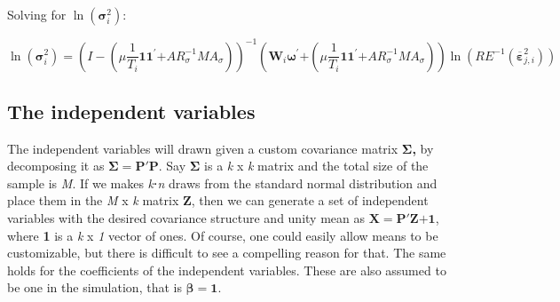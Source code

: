 \documentclass{article}
\begin{document}
Solving for $\ln\left( \mathbf{\sigma}_{i}^{2} \right)$:

\[\ln\left( \mathbf{\sigma}_{i}^{2} \right) = \left( I - \left( \mu\frac{1}{T_{i}}\mathbf{1}\mathbf{1}^{\mathbf{'}}\mathbf{+}{AR}_{\sigma}^{- 1}MA_{\sigma} \right) \right)^{- 1}\left( \mathbf{W}_{i}\mathbf{\omega}^{\mathbf{'}}\mathbf{+}\left( \mu\frac{1}{T_{i}}\mathbf{1}\mathbf{1}^{\mathbf{'}}\mathbf{+}{AR}_{\sigma}^{- 1}MA_{\sigma} \right) \right)\ln\left( {RE}^{- 1}\left( {\overline{\mathbf{\varepsilon}}}_{j,i}^{2} \right) \right)\]

\subsection{The independent variables}\label{the-independent-variables}

The independent variables will drawn given a custom covariance matrix
$\mathbf{\Sigma}$\textbf{,} by decomposing it as
$\mathbf{\Sigma} = \mathbf{P'P}$. Say $\mathbf{\Sigma}$ is a
\emph{k} x \emph{k} matrix and the total size of the sample is \emph{M}.
If we makes \emph{k}⋅\emph{n} draws from the standard normal
distribution and place them in the \emph{M} x \emph{k} matrix
$\mathbf{Z}$, then we can generate a set of independent variables with
the desired covariance structure and unity mean as
$\mathbf{X} = \mathbf{P'}\mathbf{Z}\mathbf{+ 1}$, where \textbf{1} is
a \emph{k} x \emph{1} vector of ones. Of course, one could easily allow
means to be customizable, but there is difficult to see a compelling
reason for that. The same holds for the coefficients of the independent
variables. These are also assumed to be one in the simulation, that is
$\mathbf{\beta = 1}$.
\printbibliography
\end{document}
